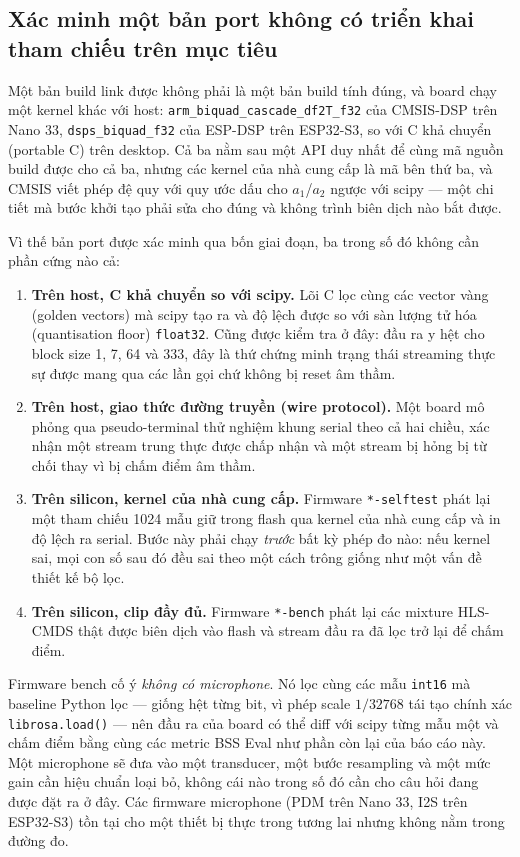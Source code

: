 \documentclass[11pt]{article}
\begin{document}
\subsection{Xác minh một bản port không có triển khai tham chiếu trên mục tiêu}
\label{sec:firmware-verify}

Một bản build link được không phải là một bản build tính đúng, và board
chạy một kernel khác với host: \texttt{arm\_biquad\_cascade\_df2T\_f32}
của CMSIS-DSP trên Nano 33, \texttt{dsps\_biquad\_f32} của ESP-DSP trên
ESP32-S3, so với C khả chuyển (portable C) trên desktop. Cả ba nằm sau
một API duy nhất để cùng mã nguồn build được cho cả ba, nhưng các kernel
của nhà cung cấp là mã bên thứ ba, và CMSIS viết phép đệ quy với quy ước
dấu cho $a_1$/$a_2$ ngược với scipy --- một chi tiết mà bước khởi tạo
phải sửa cho đúng và không trình biên dịch nào bắt được.

Vì thế bản port được xác minh qua bốn giai đoạn, ba trong số đó không cần
phần cứng nào cả:

\begin{enumerate}
  \item \textbf{Trên host, C khả chuyển so với scipy.} Lõi C lọc cùng các
    vector vàng (golden vectors) mà scipy tạo ra và độ lệch được so với sàn
    lượng tử hóa (quantisation floor) \texttt{float32}. Cũng được kiểm tra
    ở đây: đầu ra y hệt cho block size 1, 7, 64 và 333, đây là thứ chứng
    minh trạng thái streaming thực sự được mang qua các lần gọi chứ không
    bị reset âm thầm.
  \item \textbf{Trên host, giao thức đường truyền (wire protocol).} Một
    board mô phỏng qua pseudo-terminal thử nghiệm khung serial theo cả hai
    chiều, xác nhận một stream trung thực được chấp nhận và một stream bị
    hỏng bị từ chối thay vì bị chấm điểm âm thầm.
  \item \textbf{Trên silicon, kernel của nhà cung cấp.} Firmware
    \texttt{*-selftest} phát lại một tham chiếu 1024 mẫu giữ trong flash
    qua kernel của nhà cung cấp và in độ lệch ra serial. Bước này phải
    chạy \emph{trước} bất kỳ phép đo nào: nếu kernel sai, mọi con số sau
    đó đều sai theo một cách trông giống như một vấn đề thiết kế bộ lọc.
  \item \textbf{Trên silicon, clip đầy đủ.} Firmware \texttt{*-bench} phát
    lại các mixture HLS-CMDS thật được biên dịch vào flash và stream đầu ra
    đã lọc trở lại để chấm điểm.
\end{enumerate}

Firmware bench cố ý \emph{không có microphone}. Nó lọc cùng các mẫu
\texttt{int16} mà baseline Python lọc --- giống hệt từng bit, vì phép
scale $1/32768$ tái tạo chính xác \texttt{librosa.load()} --- nên đầu ra
của board có thể diff với scipy từng mẫu một và chấm điểm bằng cùng các
metric BSS Eval như phần còn lại của báo cáo này. Một microphone sẽ đưa
vào một transducer, một bước resampling và một mức gain cần hiệu chuẩn
loại bỏ, không cái nào trong số đó cần cho câu hỏi đang được đặt ra ở
đây. Các firmware microphone (PDM trên Nano 33, I2S trên ESP32-S3) tồn
tại cho một thiết bị thực trong tương lai nhưng không nằm trong đường đo.
\end{document}
